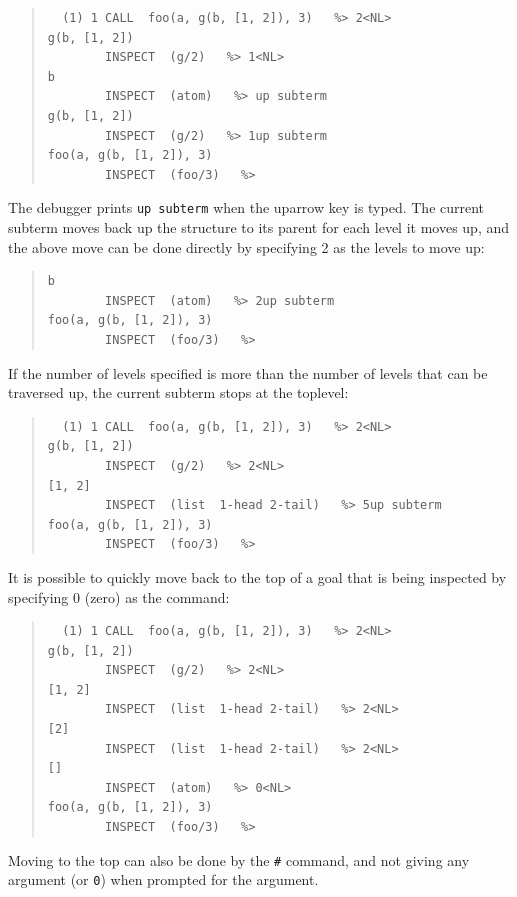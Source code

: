 \begin{descr}{1cm}
\begin{quote}\begin{verbatim}
  (1) 1 CALL  foo(a, g(b, [1, 2]), 3)   %> 2<NL>
g(b, [1, 2])
        INSPECT  (g/2)   %> 1<NL>
b
        INSPECT  (atom)   %> up subterm
g(b, [1, 2])
        INSPECT  (g/2)   %> 1up subterm
foo(a, g(b, [1, 2]), 3)
        INSPECT  (foo/3)   %> 
\end{verbatim}\end{quote}

The debugger prints \verb'up subterm' when the uparrow key is typed. The
current subterm moves back up the structure to its parent for each level it
moves up, and the above move can be done directly by specifying 2 as the
levels to move up:

\begin{quote}\begin{verbatim}
b
        INSPECT  (atom)   %> 2up subterm
foo(a, g(b, [1, 2]), 3)
        INSPECT  (foo/3)   %> 
\end{verbatim}\end{quote}

If the number of levels specified is more than the number of levels that
can be traversed up, the current subterm stops at the toplevel:

\begin{quote}\begin{verbatim}
  (1) 1 CALL  foo(a, g(b, [1, 2]), 3)   %> 2<NL>
g(b, [1, 2])
        INSPECT  (g/2)   %> 2<NL>
[1, 2]
        INSPECT  (list  1-head 2-tail)   %> 5up subterm
foo(a, g(b, [1, 2]), 3)
        INSPECT  (foo/3)   %> 
\end{verbatim}\end{quote}


It is possible to quickly move back to the top of a goal that is being
inspected by specifying 0 (zero) as the command:

\begin{quote}\begin{verbatim}
  (1) 1 CALL  foo(a, g(b, [1, 2]), 3)   %> 2<NL>
g(b, [1, 2])
        INSPECT  (g/2)   %> 2<NL>
[1, 2]
        INSPECT  (list  1-head 2-tail)   %> 2<NL>
[2]
        INSPECT  (list  1-head 2-tail)   %> 2<NL>
[]
        INSPECT  (atom)   %> 0<NL>
foo(a, g(b, [1, 2]), 3)
        INSPECT  (foo/3)   %> 
\end{verbatim}\end{quote}

Moving to the top can also be done by the \verb'#' command, and not giving
any argument (or \verb'0') when prompted for the argument.


\end{descr}
